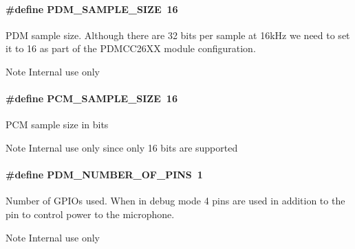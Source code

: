 \paragraph[{P\+D\+M\+\_\+\+S\+A\+M\+P\+L\+E\+\_\+\+S\+I\+Z\+E}]{\setlength{\rightskip}{0pt plus 5cm}\#define P\+D\+M\+\_\+\+S\+A\+M\+P\+L\+E\+\_\+\+S\+I\+Z\+E~16}\label{_p_d_m_c_c26_x_x_8h_ac840e0d8746e13c1e59d48221e050400}
P\+D\+M sample size. Although there are 32 bits per sample at 16k\+Hz we need to set it to 16 as part of the P\+D\+M\+C\+C26\+X\+X module configuration. \begin{DoxyNote}{Note}
Internal use only 
\end{DoxyNote}
\paragraph[{P\+C\+M\+\_\+\+S\+A\+M\+P\+L\+E\+\_\+\+S\+I\+Z\+E}]{\setlength{\rightskip}{0pt plus 5cm}\#define P\+C\+M\+\_\+\+S\+A\+M\+P\+L\+E\+\_\+\+S\+I\+Z\+E~16}\label{_p_d_m_c_c26_x_x_8h_a77f1de681b5b50d6e6db60818b5a481d}
P\+C\+M sample size in bits \begin{DoxyNote}{Note}
Internal use only since only 16 bits are supported 
\end{DoxyNote}
\paragraph[{P\+D\+M\+\_\+\+N\+U\+M\+B\+E\+R\+\_\+\+O\+F\+\_\+\+P\+I\+N\+S}]{\setlength{\rightskip}{0pt plus 5cm}\#define P\+D\+M\+\_\+\+N\+U\+M\+B\+E\+R\+\_\+\+O\+F\+\_\+\+P\+I\+N\+S~1}\label{_p_d_m_c_c26_x_x_8h_af5494f23156b07d2e4a017d92bd65e59}
Number of G\+P\+I\+Os used. When in debug mode 4 pins are used in addition to the pin to control power to the microphone. \begin{DoxyNote}{Note}
Internal use only 
\end{DoxyNote}
